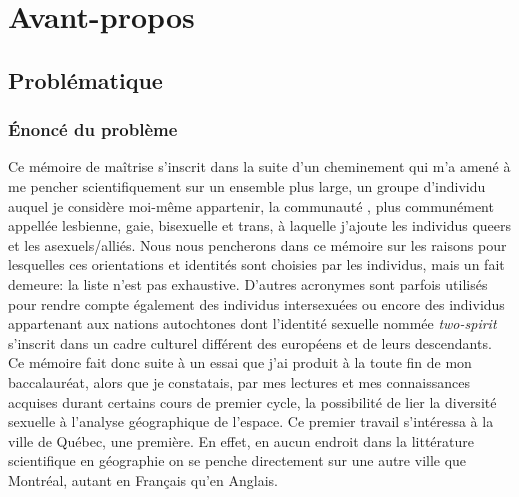 \chapter*{Avant-propos}         %

\section{Problématique}
\label{sec:problematique}


\subsection{Énoncé du problème}
\label{sub:enonce_du_probleme} 

Ce mémoire de maîtrise s'inscrit dans la suite d'un cheminement qui m'a amené à
me pencher scientifiquement sur un ensemble plus large, un groupe d'individu
auquel je considère moi-même appartenir, la communauté \lgbt{}, plus communément
appellée lesbienne, gaie, bisexuelle et trans, à laquelle j'ajoute les individus
queers et les asexuels/alliés. Nous nous pencherons dans ce mémoire
sur les raisons pour lesquelles ces orientations et identités sont choisies par
les individus, mais un fait demeure: la liste n'est pas exhaustive. D'autres
acronymes sont parfois utilisés pour rendre compte également des individus
intersexuées ou encore des individus appartenant aux nations autochtones dont
l'identité sexuelle nommée \emph{two-spirit} s'inscrit dans un cadre culturel
différent des européens et de leurs descendants. Ce mémoire fait donc suite à un
essai que j'ai produit à la toute fin de mon baccalauréat, alors que je
constatais, par mes lectures et mes connaissances acquises durant certains cours
de premier cycle, la possibilité de lier la diversité sexuelle à l'analyse
géographique de l'espace. Ce premier travail s'intéressa à la ville de Québec,
une première. En effet, en aucun endroit dans la littérature scientifique en
géographie on se penche directement sur une autre ville que Montréal, autant en
Français qu'en Anglais.

